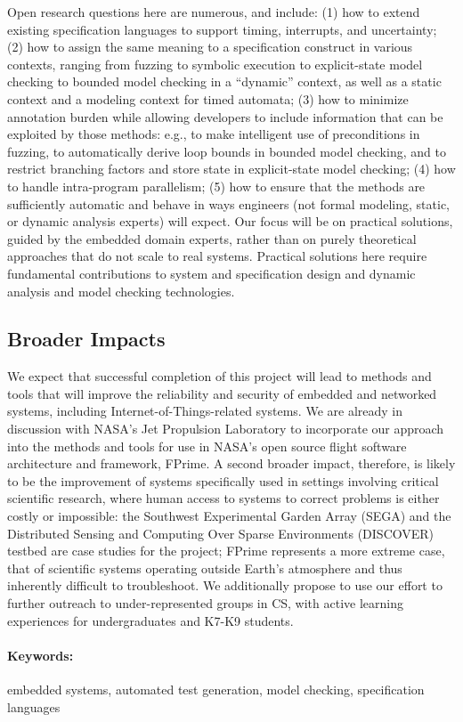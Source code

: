 \documentclass[11pt]{article}
\begin{document}
Open research questions here are numerous, and include: (1) how to extend existing specification languages to support timing, interrupts, and uncertainty; (2) how to assign the same meaning to a specification construct in various contexts, ranging from fuzzing to symbolic execution to explicit-state model checking to bounded model checking in a ``dynamic'' context, as well as a static context and a modeling context for timed automata; (3) how to minimize annotation burden while allowing developers to include information that can be exploited by those methods: e.g., to make intelligent use of preconditions in fuzzing, to automatically derive loop bounds in bounded model checking, and to restrict branching factors and store state in explicit-state model checking; (4) how to handle intra-program parallelism; (5) how to ensure that the methods are sufficiently automatic and behave in ways engineers (not formal modeling, static, or dynamic analysis experts) will expect. Our focus will be on practical solutions, guided by the embedded domain experts, rather than on purely theoretical approaches that do not scale to real systems. Practical solutions here require fundamental contributions to system and specification design and dynamic analysis and model checking technologies.

\subsection*{Broader Impacts}

We expect that successful completion of this project will lead to methods and tools that will improve the reliability and security of embedded and networked systems, including Internet-of-Things-related systems. We are already in discussion with NASA's Jet Propulsion Laboratory to incorporate our approach into the methods and tools for use in NASA's open source flight software architecture and framework, FPrime. A second broader impact, therefore, is likely to be the improvement of systems specifically used in settings involving critical scientific research, where human access to systems to correct problems is either costly or impossible: %
the Southwest Experimental Garden Array (SEGA) and the Distributed Sensing and Computing Over Sparse Environments (DISCOVER) testbed are case studies for the project; FPrime represents a more extreme case, that of scientific systems operating outside Earth's atmosphere and thus inherently difficult to troubleshoot.  We additionally propose to use our effort to further outreach to under-represented groups in CS, with active learning experiences for undergraduates and K7-K9 students.

\paragraph{Keywords:} embedded systems, automated test generation, model checking, specification languages
\end{document}
